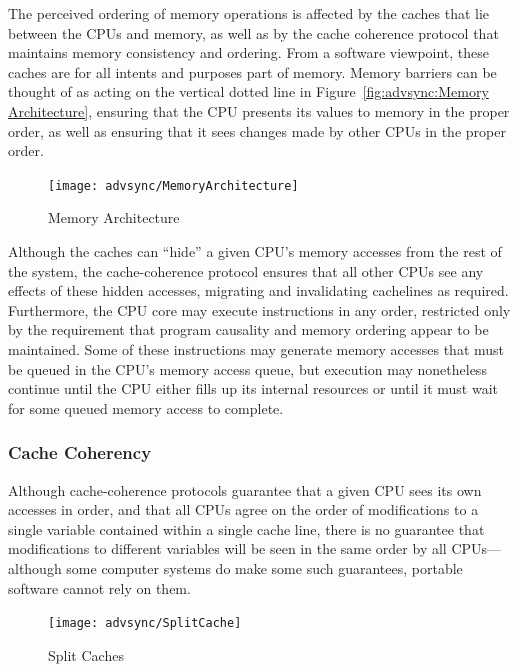 The perceived ordering of memory operations is affected by the caches
that lie between the CPUs and memory, as well as by the cache coherence
protocol that maintains memory consistency and ordering.
From a software viewpoint, these caches are for all intents and purposes
part of memory.
Memory barriers can be thought of as acting on the vertical dotted line in
Figure~\ref{fig:advsync:Memory Architecture}, ensuring that the CPU
presents its values to memory in the proper order, as well as ensuring
that it sees changes made by other CPUs in the proper order.

\begin{figure}[htb]
\centering
\texttt{[image: advsync/MemoryArchitecture]}
\caption{Memory Architecture}
\end{figure}

Although the caches can ``hide'' a given CPU's memory accesses from the rest of
the system, the cache-coherence protocol ensures that all other CPUs see
any effects of these hidden accesses, migrating and invalidating cachelines
as required.
Furthermore, the CPU core may execute instructions in any order, restricted
only by the requirement that program causality and memory ordering
appear to be maintained.
Some of these instructions may generate memory accesses that must be queued
in the CPU's memory access queue, but execution may nonetheless continue
until the CPU either fills up its internal resources or until it must
wait for some queued memory access to complete.

\subsubsection{Cache Coherency}
\label{sec:advsync:Cache Coherency}

Although cache-coherence protocols guarantee that a given CPU sees its
own accesses in order, and that all CPUs agree on the order of modifications
to a single variable contained within a single cache line, there is no
guarantee that modifications to different variables will be seen in
the same order by all CPUs---although some computer systems do make
some such guarantees, portable software cannot rely on them.

\begin{figure}[htb]
\centering
\texttt{[image: advsync/SplitCache]}
\caption{Split Caches}
\end{figure}

